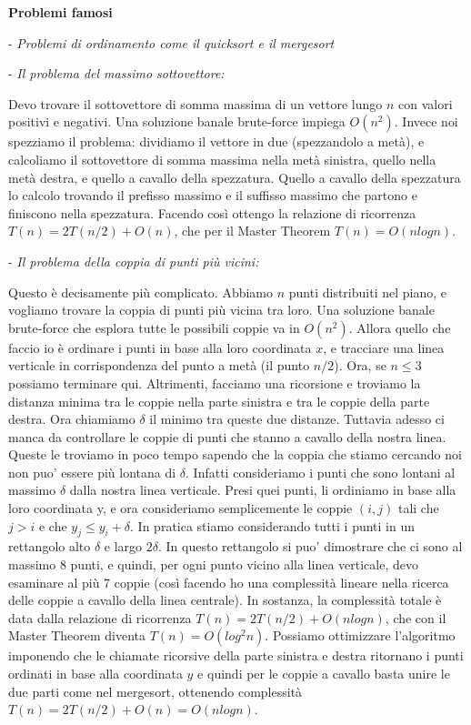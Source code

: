 \documentclass[a4paper,10pt]{article} %
\renewcommand{\b}[1]{%
    {\textbf{#1}}}
\begin{document}
\bigskip
\centerline{\b{Problemi famosi}}
\bigskip

- \emph{Problemi di ordinamento come il quicksort e il mergesort}\par
\bigskip

- \emph{Il problema del massimo sottovettore:} \par
Devo trovare il sottovettore di somma massima di un vettore lungo $n$ con valori positivi e negativi. Una soluzione banale brute-force impiega $O(n^2)$. Invece noi spezziamo il problema: dividiamo il vettore in due (spezzandolo a metà), e calcoliamo il sottovettore di somma massima nella metà sinistra, quello nella metà destra, e quello a cavallo della spezzatura. Quello a cavallo della spezzatura lo calcolo trovando il prefisso massimo e il suffisso massimo che partono e finiscono nella spezzatura. Facendo così ottengo la relazione di ricorrenza $T(n) = 2T(n/2) + O(n)$, che per il Master Theorem $T(n) = O(nlogn)$. 
\bigskip

- \emph{Il problema della coppia di punti più vicini:} \par
Questo è decisamente più complicato. Abbiamo $n$ punti distribuiti nel piano, e vogliamo trovare la coppia di punti più vicina tra loro. Una soluzione banale brute-force che esplora tutte le possibili coppie va in $O(n^2)$. Allora quello che faccio io è ordinare i punti in base alla loro coordinata $x$, e tracciare una linea verticale in corrispondenza del punto a metà (il punto $n/2$). Ora, se $n \leq 3$ possiamo terminare qui. Altrimenti, facciamo una ricorsione e troviamo la distanza minima tra le coppie nella parte sinistra e tra le coppie della parte destra. Ora chiamiamo $\delta$ il minimo tra queste due distanze. Tuttavia adesso ci manca da controllare le coppie di punti che stanno a cavallo della nostra linea. Queste le troviamo in poco tempo sapendo che la coppia che stiamo cercando noi non puo' essere più lontana di $\delta$. Infatti consideriamo i punti che sono lontani al massimo $\delta$ dalla nostra linea verticale. Presi quei punti, li ordiniamo in base alla loro coordinata y, e ora consideriamo semplicemente le coppie $(i, j)$ tali che $j > i$ e che $y_j \leq y_i + \delta$. In pratica stiamo considerando tutti i punti in un rettangolo alto $\delta$ e largo $2\delta$. In questo rettangolo si puo' dimostrare che ci sono al massimo 8 punti, e quindi, per ogni punto vicino alla linea verticale, devo esaminare al più 7 coppie (così facendo ho una complessità lineare nella ricerca delle coppie a cavallo della linea centrale). In sostanza, la complessità totale è data dalla relazione di ricorrenza $T(n) = 2T(n/2) +  O(nlogn)$, che con il Master Theorem diventa $T(n) = O(log^2n)$. Possiamo ottimizzare l'algoritmo imponendo che le chiamate ricorsive della parte sinistra e destra ritornano i punti ordinati in base alla coordinata $y$ e quindi per le coppie a cavallo basta unire le due parti come nel mergesort, ottenendo complessità $T(n) = 2T(n/2) + O(n) = O(nlogn)$.
\bigskip
\end{document}
